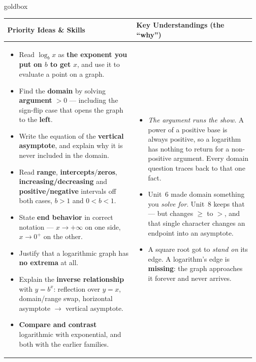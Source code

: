 \documentclass[10pt]{article}
\begin{document}
\renewcommand{\arraystretch}{1.4}
\begin{skillbox}{goldbox}
\begin{tabularx}{\linewidth}{@{}X|X@{}}
\textbf{Priority Ideas \& Skills} & \textbf{Key Understandings (the ``why'')} \\[2pt]
\hline
\vspace{-6pt}
\begin{itemize}[leftmargin=1.1em, nosep, after=\vspace{2pt}]
  \item Read $\log_b x$ as \textbf{the exponent you put on $b$ to get $x$}, and use it to evaluate a point on a graph.
  \item Find the \textbf{domain} by solving \textbf{argument} $>0$ --- including the sign-flip case that opens the graph to the \textbf{left}.
  \item Write the equation of the \textbf{vertical asymptote}, and explain why it is never included in the domain.
  \item Read \textbf{range}, \textbf{intercepts}/\textbf{zeros}, \textbf{increasing/decreasing} and \textbf{positive/negative} intervals off both cases, $b>1$ and $0<b<1$.
  \item State \textbf{end behavior} in correct notation --- $x\to+\infty$ on one side, $x\to 0^{+}$ on the other.
  \item Justify that a logarithmic graph has \textbf{no extrema} at all.
  \item Explain the \textbf{inverse relationship} with $y=b^x$: reflection over $y=x$, domain/range swap, horizontal asymptote $\to$ vertical asymptote.
  \item \textbf{Compare and contrast} logarithmic with exponential, and both with the earlier families.
\end{itemize}
&
\vspace{-6pt}
\begin{itemize}[leftmargin=1.1em, nosep, after=\vspace{2pt}]
  \item \emph{The argument runs the show.} A power of a positive base is always positive, so a logarithm has nothing to return for a non-positive argument. Every domain question traces back to that one fact.
  \item Unit~6 made domain something you \emph{solve for}. Unit~8 keeps that --- but changes $\ge$ to $>$, and that single character changes an endpoint into an asymptote.
  \item A square root got to \emph{stand on} its edge. A logarithm's edge is \textbf{missing}: the graph approaches it forever and never arrives.

\end{itemize}
\end{tabularx}
\end{skillbox}
\end{document}
